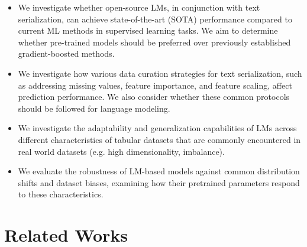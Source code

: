 \documentclass{article}
\theoremstyle{plain}
\theoremstyle{definition}
\theoremstyle{remark}
\begin{document}
\begin{itemize}
    \vspace*{-0.3cm}
    \item We investigate whether open-source LMs, in conjunction with text serialization, can achieve state-of-the-art (SOTA) performance compared to current ML methods in supervised learning tasks. We aim to determine whether pre-trained models should be preferred over previously established gradient-boosted methods.
    \vspace*{-0.3cm}
    \item We investigate how various data curation strategies for text serialization, such as addressing missing values, feature importance, and feature scaling, affect prediction performance. We also consider whether these common protocols should be followed for language modeling. 
    \vspace*{-0.3cm}
    \item We investigate the adaptability and generalization capabilities of LMs across different characteristics of tabular datasets that are commonly encountered in real world datasets (e.g. high dimensionality, imbalance).
    \vspace*{-0.2cm}
    \item We evaluate the robustness of LM-based models against common distribution shifts and dataset biases, examining how their pretrained parameters respond to these characteristics.
    \vspace*{-0.3cm}
\end{itemize}



\section{Related Works}
\end{document}
